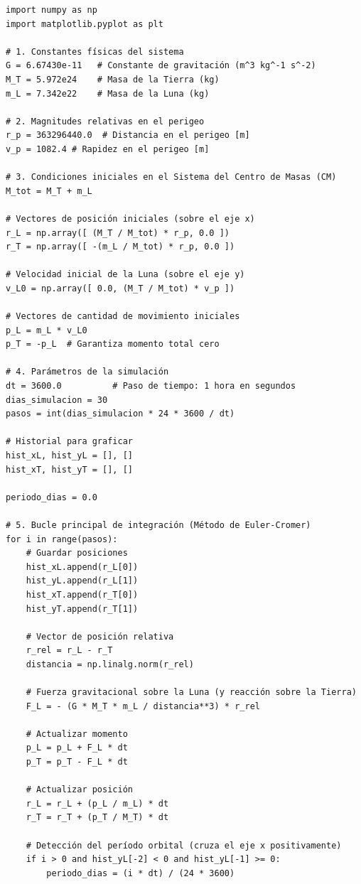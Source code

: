 \documentclass[11pt,a4paper]{book}
\begin{document}
\begin{listing}[htbp]
\begin{verbatim}
import numpy as np
import matplotlib.pyplot as plt

# 1. Constantes físicas del sistema
G = 6.67430e-11   # Constante de gravitación (m^3 kg^-1 s^-2)
M_T = 5.972e24    # Masa de la Tierra (kg)
m_L = 7.342e22    # Masa de la Luna (kg)

# 2. Magnitudes relativas en el perigeo
r_p = 363296440.0  # Distancia en el perigeo [m]
v_p = 1082.4 # Rapidez en el perigeo [m]

# 3. Condiciones iniciales en el Sistema del Centro de Masas (CM)
M_tot = M_T + m_L

# Vectores de posición iniciales (sobre el eje x)
r_L = np.array([ (M_T / M_tot) * r_p, 0.0 ])
r_T = np.array([ -(m_L / M_tot) * r_p, 0.0 ])

# Velocidad inicial de la Luna (sobre el eje y)
v_L0 = np.array([ 0.0, (M_T / M_tot) * v_p ])

# Vectores de cantidad de movimiento iniciales
p_L = m_L * v_L0
p_T = -p_L  # Garantiza momento total cero

# 4. Parámetros de la simulación
dt = 3600.0          # Paso de tiempo: 1 hora en segundos
dias_simulacion = 30
pasos = int(dias_simulacion * 24 * 3600 / dt)

# Historial para graficar
hist_xL, hist_yL = [], []
hist_xT, hist_yT = [], []

periodo_dias = 0.0

# 5. Bucle principal de integración (Método de Euler-Cromer)
for i in range(pasos):
    # Guardar posiciones
    hist_xL.append(r_L[0])
    hist_yL.append(r_L[1])
    hist_xT.append(r_T[0])
    hist_yT.append(r_T[1])
    
    # Vector de posición relativa
    r_rel = r_L - r_T
    distancia = np.linalg.norm(r_rel)
    
    # Fuerza gravitacional sobre la Luna (y reacción sobre la Tierra)
    F_L = - (G * M_T * m_L / distancia**3) * r_rel
    
    # Actualizar momento
    p_L = p_L + F_L * dt
    p_T = p_T - F_L * dt
    
    # Actualizar posición
    r_L = r_L + (p_L / m_L) * dt
    r_T = r_T + (p_T / M_T) * dt
    
    # Detección del período orbital (cruza el eje x positivamente)
    if i > 0 and hist_yL[-2] < 0 and hist_yL[-1] >= 0:
        periodo_dias = (i * dt) / (24 * 3600)


\end{verbatim}
\end{listing}
\end{document}

